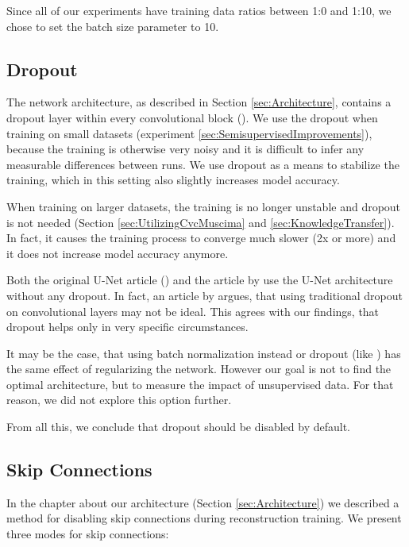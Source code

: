 Since all of our experiments have training data ratios between 1:0 and 1:10, we chose to set the batch size parameter to 10.


\subsection{Dropout}
\label{sec:Dropout}

The network architecture, as described in Section \ref{sec:Architecture}, contains a dropout layer within every convolutional block (\cite{Dropout}). We use the dropout when training on small datasets (experiment \ref{sec:SemisupervisedImprovements}), because the training is otherwise very noisy and it is difficult to infer any measurable differences between runs. We use dropout as a means to stabilize the training, which in this setting also slightly increases model accuracy.

When training on larger datasets, the training is no longer unstable and dropout is not needed (Section \ref{sec:UtilizingCvcMuscima} and \ref{sec:KnowledgeTransfer}). In fact, it causes the training process to converge much slower (2x or more) and it does not increase model accuracy anymore.

Both the original U-Net article (\cite{UNet}) and the article by \cite{HajicEtAl} use the U-Net architecture without any dropout. In fact, an article by \cite{DropoutOnConvolutions} argues, that using traditional dropout on convolutional layers may not be ideal. This agrees with our findings, that dropout helps only in very specific circumstances.

It may be the case, that using batch normalization instead or dropout (like \cite{HajicEtAl}) has the same effect of regularizing the network. However our goal is not to find the optimal architecture, but to measure the impact of unsupervised data. For that reason, we did not explore this option further.

From all this, we conclude that dropout should be disabled by default.


\subsection{Skip Connections}
\label{sec:SkipConnections}

In the chapter about our architecture (Section \ref{sec:Architecture}) we described a method for disabling skip connections during reconstruction training. We present three modes for skip connections:

